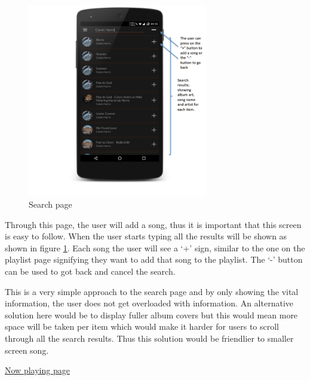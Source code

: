 \noindent
\begin{figure}[h!]
\centering
\includegraphics[width=0.7\textwidth]{./img/searchannotated.png}
\caption{Search page}
\label{fig:searchpage}
\end{figure}

Through this page, the user will add a song, thus it is important that this screen is easy to follow. When the user starts typing all the results will be shown as shown in figure \ref{fig:searchpage}. Each song the user will see a `+' sign, similar to the one on the playlist page signifying they want to add that song to the playlist. The `-' button can be used to got back and cancel the search. 

This is a very simple approach to the search page and by only showing the vital information, the user does not get overloaded with information. An alternative solution here would be to display fuller album covers but this would mean more space will be taken per item which would make it harder for users to scroll through all the search results. Thus this solution would be friendlier to smaller screen song.

\clearpage

\noindent\underline{Now playing page}\newline

